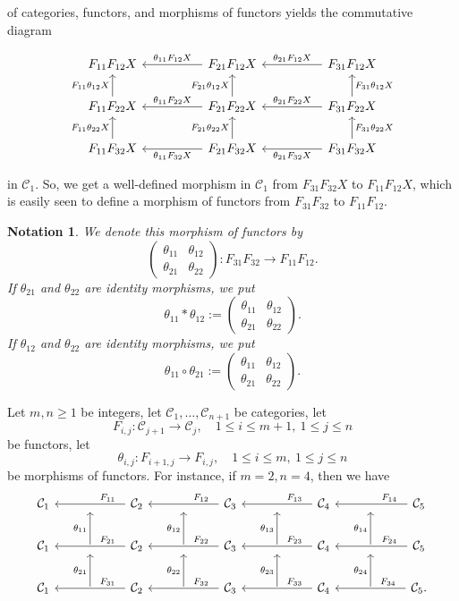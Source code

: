 \documentclass[12pt]{article}
\newtheorem{nota}[thm]{Notation}
\theoremstyle{remark}
\theoremstyle{definition}
\newcommand{\nn}{\noindent}
\newcommand{\C}{\mathcal C}
\begin{document}
\nn of categories, functors, and morphisms of functors yields the commutative diagram 

$$
\begin{tikzcd}
%
F_{11}F_{12}X&&F_{21}F_{12}X\ar{ll}[swap]{\theta_{11}F_{12}X}&&F_{31}F_{12}X\ar{ll}[swap]{\theta_{21}F_{12}X}\\ 
%
F_{11}F_{22}X\ar{u}{F_{11}\theta_{12}X}&&F_{21}F_{22}X\ar{ll}[swap]{\theta_{11}F_{22}X}\ar{u}{F_{21}\theta_{12}X}&&F_{31}F_{22}X\ar{ll}[swap]{\theta_{21}F_{22}X}\ar{u}[swap]{F_{31}\theta_{12}X}\\ 
%
F_{11}F_{32}X\ar{u}{F_{11}\theta_{22}X}&&F_{21}F_{32}X\ar{ll}{\theta_{11}F_{32}X}\ar{u}{F_{21}\theta_{22}X}&&F_{31}F_{32}X\ar{ll}{\theta_{21}F_{32}X}\ar{u}[swap]{F_{31}\theta_{22}X}
%
\end{tikzcd}
$$ 

\nn in $\C_1$. So, we get a well-defined morphism in $\C_1$ from $F_{31}F_{32}X$ to $F_{11}F_{12}X$, which is easily seen to define a morphism of functors from $F_{31}F_{32}$ to $F_{11}F_{12}$. 

\begin{nota}\label{nhove}
We denote this morphism of functors by
$$
\begin{pmatrix}
\theta_{11}&\theta_{12}\\ 
\theta_{21}&\theta_{22}
\end{pmatrix}:F_{31}F_{32}\to F_{11}F_{12}.
$$ 
If $\theta_{21}$ and $\theta_{22}$ are identity morphisms, we put 
$$
\theta_{11}*\theta_{12}:=
\begin{pmatrix}
\theta_{11}&\theta_{12}\\ 
\theta_{21}&\theta_{22}
\end{pmatrix}.
$$ 
If $\theta_{12}$ and $\theta_{22}$ are identity morphisms, we put 
$$
\theta_{11}\circ\theta_{21}:=
\begin{pmatrix}
\theta_{11}&\theta_{12}\\ 
\theta_{21}&\theta_{22}
\end{pmatrix}.
$$ 
\end{nota}

Let $m,n\ge1$ be integers, let $\C_1,\dots,\C_{n+1}$ be categories, let 
$$
F_{i,j}:\C_{j+1}\to\C_j,\quad1\le i\le m+1,\ 1\le j\le n
$$
be functors, let 
$$
\theta_{i,j}:F_{i+1,j}\to F_{i,j},\quad1\le i\le m,\ 1\le j\le n
$$
be morphisms of functors. For instance, if $m=2,n=4$, then we have 
$$
\begin{tikzcd}
%
\C_1&{}&\C_2\ar{ll}{}[near start,swap]{F_{11}}&{}&\C_3\ar{ll}{}[near start,swap]{F_{12}}&{}&\C_4\ar{ll}{}[near start,swap]{F_{13}}&{}&\C_5\ar{ll}{}[near start,swap]{F_{14}}\\ 
%
\C_1&\ar{u}{\theta_{11}}&\C_2\ar{ll}{}[near start,swap]{F_{21}}&\ar{u}{\theta_{12}}&\C_3\ar{ll}{}[near start,swap]{F_{22}}&\ar{u}{\theta_{13}}&\C_4\ar{ll}{}[near start,swap]{F_{23}}&\ar{u}{\theta_{14}}&\C_5\ar{ll}{}[near start,swap]{F_{24}}\\ 
%
\C_1&\ar{u}{\theta_{21}}&\C_2\ar{ll}{}[near start,swap]{F_{31}}&\ar{u}{\theta_{22}}&\C_3\ar{ll}{}[near start,swap]{F_{32}}&\ar{u}{\theta_{23}}&\C_4\ar{ll}{}[near start,swap]{F_{33}}&\ar{u}{\theta_{24}}&\C_5\ar{ll}{}[near start,swap]{F_{34}}.
\end{tikzcd}
$$ 
\end{document}
